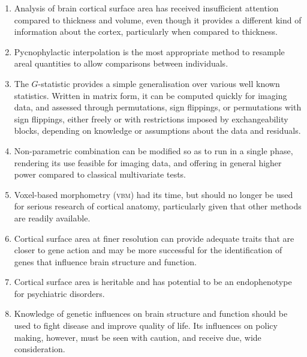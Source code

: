 \begin{enumerate}[leftmargin=*]
\item Analysis of brain cortical surface area has received insufficient attention compared to thickness and volume, even though it provides a different kind of information about the cortex, particularly when compared to thickness.
\item Pycnophylactic interpolation is the most appropriate method to resample areal quantities to allow comparisons between individuals.
\item The $G$-statistic provides a simple generalisation over various well known statistics. Written in matrix form, it can be computed quickly for imaging data, and assessed through permutations, sign flippings, or permutations with sign flippings, either freely or with restrictions imposed by exchangeability blocks,  depending on knowledge or assumptions about the data and residuals.
\item Non-parametric combination can be modified so as to run in a single phase, rendering its use feasible for imaging data, and offering in general higher power compared to classical multivariate tests.
\item Voxel-based morphometry (\textsc{vbm}) had its time, but should no longer be used for serious research of cortical anatomy, particularly given that other methods are readily available.
\item Cortical surface area at finer resolution can provide adequate traits that are closer to gene action and may be more successful for the identification of genes that influence brain structure and function.
\item Cortical surface area is heritable and has potential to be an endophenotype for psychiatric disorders.
\item Knowledge of genetic influences on brain structure and function should be used to fight disease and improve quality of life. Its influences on policy making, however, must be seen with caution, and receive due, wide consideration.
\end{enumerate}
\vspace*{\fill}